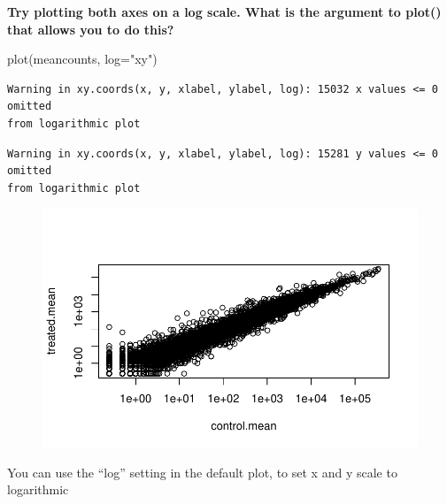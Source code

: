 \documentclass[
  letterpaper,
  DIV=11,
  numbers=noendperiod]{scrartcl}
\newenvironment{Shaded}{\begin{snugshade}}{\end{snugshade}}
\newcommand{\AttributeTok}[1]{\textcolor[rgb]{0.40,0.45,0.13}{#1}}
\newcommand{\FunctionTok}[1]{\textcolor[rgb]{0.28,0.35,0.67}{#1}}
\newcommand{\NormalTok}[1]{\textcolor[rgb]{0.00,0.23,0.31}{#1}}
\newcommand{\OtherTok}[1]{\textcolor[rgb]{0.00,0.23,0.31}{#1}}
\newcommand{\SpecialCharTok}[1]{\textcolor[rgb]{0.37,0.37,0.37}{#1}}
\newcommand{\StringTok}[1]{\textcolor[rgb]{0.13,0.47,0.30}{#1}}
\begin{document}
\textbf{Try plotting both axes on a log scale. What is the argument to
plot() that allows you to do this?}

\begin{Shaded}
\begin{Highlighting}[]
\FunctionTok{plot}\NormalTok{(meancounts, }\AttributeTok{log=}\StringTok{"xy"}\NormalTok{)}
\end{Highlighting}
\end{Shaded}

\begin{verbatim}
Warning in xy.coords(x, y, xlabel, ylabel, log): 15032 x values <= 0 omitted
from logarithmic plot
\end{verbatim}

\begin{verbatim}
Warning in xy.coords(x, y, xlabel, ylabel, log): 15281 y values <= 0 omitted
from logarithmic plot
\end{verbatim}

\begin{figure}[H]

{\centering \includegraphics{Class12_files/figure-pdf/unnamed-chunk-11-1.pdf}

}

\end{figure}

You can use the ``log'' setting in the default plot, to set x and y
scale to logarithmic

\begin{Shaded}
\end{Shaded}
\end{document}

